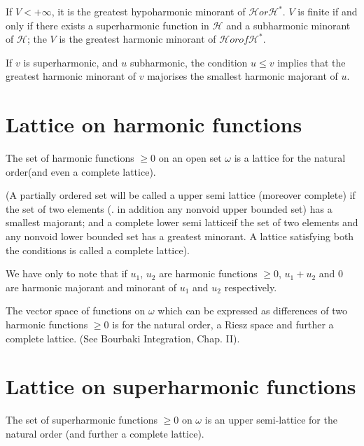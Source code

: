 If $V < + \infty$, it is the greatest hypoharmonic minorant of
$\mathscr{H} or \mathscr{H}^*$. $V$ is finite if and only if there
exists a superharmonic function in $\mathscr{H}$ and a subharmonic
minorant of $\mathscr{H}$; the $V$ is the greatest harmonic minorant
of $\mathscr{H} or of \mathscr{H}^*$. 

\begin{remark*}
  If $v$ is superharmonic, and $u$ subharmonic, the condition $u \le v$
  implies that the greatest harmonic minorant of $v$ majorises the
  smallest harmonic majorant of $u$. 
\end{remark*}

\section{Lattice on harmonic functions}\label{p4:chap4:sec17}%

\begin{thm}\label{p4:chap4:sec17:thm11}%
  The set of harmonic functions $\ge 0$ on an open set $\omega$ is a
  lattice for the natural order(and even a complete lattice). 
\end{thm}

(A partially ordered set will be called a upper semi lattice (moreover
complete) if the set of two elements (\resp. in addition any nonvoid
upper bounded set) has a smallest majorant; and a complete lower semi
lattice\pageoriginale if the set of two elements and any nonvoid lower bounded set
has a greatest minorant. A lattice satisfying both the conditions is
called a complete lattice). 

We have only to note that if $u_1$, $u_2$ are harmonic functions $\ge
0$, $u_1 + u_2$ and $0$ are harmonic majorant and minorant of $u_1$
and $u_2$ respectively. 
\begin{coro*}
  The vector space of functions on $\omega$ which can be expressed as
  differences of two harmonic functions $\ge 0$ is for the natural
  order, a Riesz space and further a complete lattice. (See Bourbaki
  Integration, Chap. II). 
\end{coro*}

\section{Lattice on superharmonic functions}\label{p4:chap4:sec18} %

\begin{prop}\label{p4:chap4:sec18:prop6}
  The set of superharmonic functions $\ge 0$ on $\omega$ is an upper
  semi-lattice for the natural order (and further a complete lattice).  
\end{prop}

